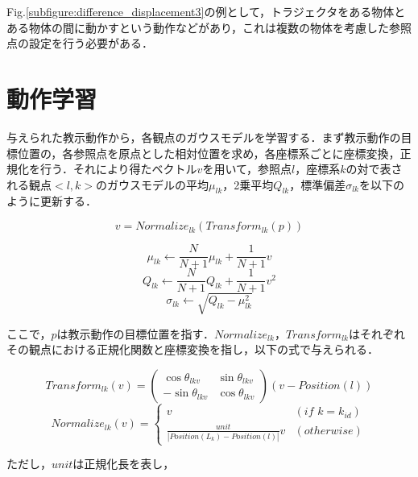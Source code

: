Fig.\ref{subfigure:difference_displacement3}の例として，トラジェクタをある物体とある物体の間に動かすという動作などがあり，これは複数の物体を考慮した参照点の設定を行う必要がある．

\section{動作学習}

与えられた教示動作から，各観点のガウスモデルを学習する．まず教示動作の目標位置の，各参照点を原点とした相対位置を求め，各座標系ごとに座標変換，正規化を行う．それにより得たベクトル$v$を用いて，参照点$l$，座標系$k$の対で表される観点$<l , k>$のガウスモデルの平均$μ_{lk}$，2乗平均$Q_{lk}$，標準偏差$σ_{lk}$を以下のように更新する．

\begin{equation}
	v = Normalize_{lk}(Transform_{lk}(p))
\end{equation}

\begin{equation}
	μ_{lk}  \leftarrow \frac{N}{N+1}μ_{lk}+\frac{1}{N+1}v
\end{equation}
\begin{equation}
	Q_{lk}  \leftarrow \frac{N}{N+1}Q_{lk}+\frac{1}{N+1}v^2	
\end{equation}
\begin{equation}
	σ_{lk}  \leftarrow \sqrt{Q_{lk} - μ_{lk}^2}
\end{equation}

ここで，$p$は教示動作の目標位置を指す．$Normalize_{lk}$，$Transform_{lk}$はそれぞれその観点における正規化関数と座標変換を指し，以下の式で与えられる．


\begin{equation}
	Transform_{lk}(v) = 
	\begin{pmatrix}
        	\cos θ_{lkv} & \sin θ_{lkv} \\
        	-\sin θ_{lkv} & \cos θ_{lkv}
	\end{pmatrix}
	(v-Position(l))
\end{equation}
\begin{equation}
	\label{equation:normalize}
	Normalize_{lk}(v) = 
	\begin{cases}
		v & (if\,\,k=k_{id}) \\
		\frac{unit}{| Position(L_{k})-Position(l) |}v & (otherwise)
	\end{cases}
\end{equation}

ただし，$unit$は正規化長を表し，

